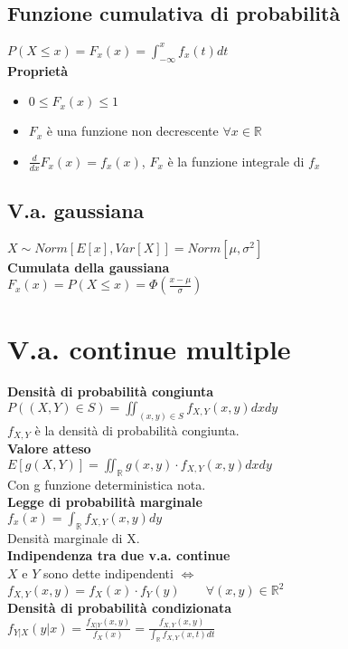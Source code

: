 \documentclass{article}
\begin{document}
\begin{multicols*}{3}
		\subsection{Funzione cumulativa di probabilità}
		\(P(X\leq x) = F_x (x) = \int_{-\infty}^{x} f_x (t) dt\)\\
		\textbf{Proprietà}
		\begin{itemize}
			\item \(0\leq F_x (x) \leq 1\)
			\item \(F_x\) è una funzione non decrescente \(\forall x \in \mathbb{R}\)
			\item \(\frac{d}{dx} F_x (x) = f_x (x)\), \(F_x\) è la funzione integrale di \(f_x\)  
		\end{itemize}
		\subsection{V.a. gaussiana}
		\(X \sim Norm[E[x],Var[X]] = Norm[\mu,\sigma^2]\)\\
		\textbf{Cumulata della gaussiana}\\
		\(F_x(x) = P(X\leq x) = \Phi(\frac{x-\mu}{\sigma})\)
		
		\section{V.a. continue multiple}
		\textbf{Densità di probabilità congiunta}\\
		\(P((X,Y)\in S) = \iint_{(x,y)\in S}f_{X,Y} (x,y) dxdy \)\\ \(f_{X,Y} \) è la densità di probabilità congiunta.\\
		\textbf{Valore atteso}\\
		\(E[g(X,Y)] = \iint_{\mathbb{R}} g(x,y)\cdot f_{X,Y}(x,y) dxdy\) \\Con g funzione deterministica nota.\\
		\textbf{Legge di probabilità marginale}\\
		\(f_x(x) = \int_{\mathbb{R}}^{} f_{X,Y}(x,y) dy\)\\
		Densità marginale di X.\\
		\textbf{Indipendenza tra due v.a. continue}\\
		\(X\) e \(Y\) sono dette indipendenti \(\iff\) \(f_{X,Y}(x,y) = f_X(x)\cdot f_Y(y) \qquad \forall (x,y) \in \mathbb{R}^2\)\\
		\textbf{Densità di probabilità condizionata}\\
		\(f_{Y|X}(y|x) = \frac{f_{X|Y} (x,y)}{f_X (x)} = \frac{f_{X,Y} (x,y)}{\int_{\mathbb{R}} f_{X,Y} (x,t) dt}\)\\
		

\end{multicols*}
\end{document}
